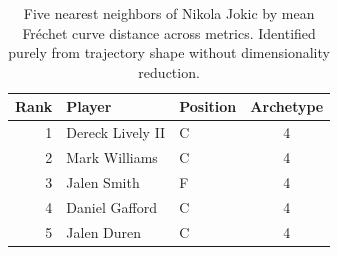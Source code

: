 \begin{table}[htbp]
  \centering\small
  \begin{tabular}{rllc}
    \toprule
    Rank & Player & Position & Archetype \\
    \midrule
    1 & Dereck Lively II & C & 4 \\
    2 & Mark Williams & C & 4 \\
    3 & Jalen Smith & F & 4 \\
    4 & Daniel Gafford & C & 4 \\
    5 & Jalen Duren & C & 4 \\
    \bottomrule
  \end{tabular}
  \caption{Five nearest neighbors of Nikola Jokic by mean Fr\'{e}chet curve distance across metrics. Identified purely from trajectory shape without dimensionality reduction.}
  \label{tab:Nikola_Jokic_frechet_curve_neighbors}
\end{table}

